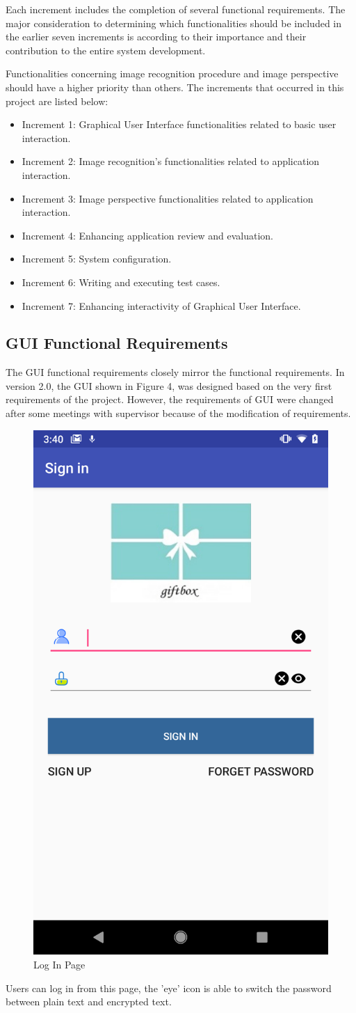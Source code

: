 \par Each increment includes the completion of several functional requirements. The major consideration to determining which functionalities should be included in the earlier seven increments is according to their importance and their contribution to the entire system development.
\par Functionalities concerning image recognition procedure  and image perspective should have a higher priority than others. The increments that occurred in this project are listed below:
\begin{itemize}
\item Increment 1: Graphical User Interface functionalities related to basic user interaction.
\item Increment 2: Image recognition's functionalities related to application interaction.
\item Increment 3: Image perspective functionalities related to application interaction.
\item Increment 4: Enhancing application review and evaluation.
\item Increment 5: System configuration.
\item Increment 6: Writing and executing test cases.
\item Increment 7: Enhancing interactivity of Graphical User Interface.
\end{itemize}

\subsection{GUI Functional Requirements}
The GUI functional requirements closely mirror the functional requirements. In version 2.0, the GUI shown in Figure 4, was designed based on the very first requirements of the project. However, the requirements of GUI were changed after some meetings with supervisor because of the modification of requirements.
\begin{figure}[H]
\centering
\includegraphics[width=.25\textwidth]{section02/assets/SignIn.png}
\caption[Short Caption 2]{\label{SignIn}Log In Page}
\end{figure}
\par Users can log in from this page, the 'eye' icon is able to switch the password between plain text and encrypted text.

